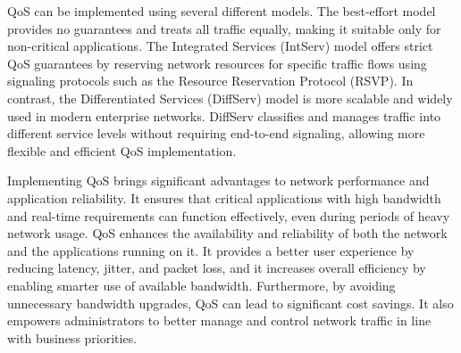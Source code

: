 QoS can be implemented using several different models. The best-effort model provides no guarantees and treats all traffic equally, making it suitable only for non-critical applications. The Integrated Services (IntServ) model offers strict QoS guarantees by reserving network resources for specific traffic flows using signaling protocols such as the Resource Reservation Protocol (RSVP). In contrast, the Differentiated Services (DiffServ) model is more scalable and widely used in modern enterprise networks. DiffServ classifies and manages traffic into different service levels without requiring end-to-end signaling, allowing more flexible and efficient QoS implementation.


Implementing QoS brings significant advantages to network performance and application reliability. It ensures that critical applications with high bandwidth and real-time requirements can function effectively, even during periods of heavy network usage. QoS enhances the availability and reliability of both the network and the applications running on it. It provides a better user experience by reducing latency, jitter, and packet loss, and it increases overall efficiency by enabling smarter use of available bandwidth. Furthermore, by avoiding unnecessary bandwidth upgrades, QoS can lead to significant cost savings. It also empowers administrators to better manage and control network traffic in line with business priorities.
